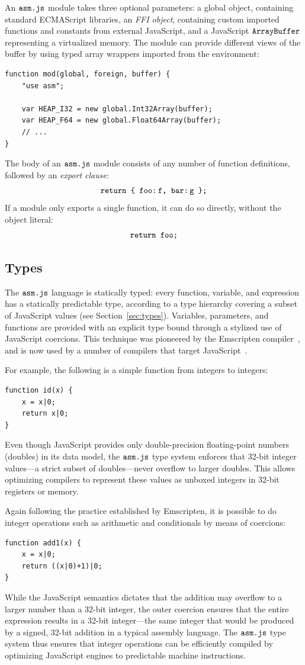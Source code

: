 \documentclass{article}
\newcommand{\mathjs}[1]{\mbox{\texttt{{#1}}}}
\newcommand{\return}[1]{\mathjs{return }{#1}\mathjs{;}}
\begin{document}
An $\mathjs{asm.js}$ module takes three optional parameters: a global
object, containing standard ECMAScript libraries, an {\it FFI object},
containing custom imported functions and constants from external
JavaScript, and a JavaScript $\mathjs{ArrayBuffer}$ representing a
virtualized memory. The module can provide different views of the
buffer by using typed array wrappers imported from the environment:
\begin{verbatim}
function mod(global, foreign, buffer) {
    "use asm";

    var HEAP_I32 = new global.Int32Array(buffer);
    var HEAP_F64 = new global.Float64Array(buffer);
    // ...
}
\end{verbatim}

The body of an $\mathjs{asm.js}$ module consists of any number of
function definitions, followed by an {\it export clause}:
\[
\return{\mathjs{\char123{} foo:\,f, bar:\,g \char125{}}}
\]
If a module only exports a single function, it can do so directly,
without the object literal:
\[
\return{\mathjs{foo}}
\]

\subsection{Types}

The $\mathjs{asm.js}$ language is statically typed: every function,
variable, and expression has a statically predictable type, according
to a type hierarchy covering a subset of JavaScript values (see
Section~\ref{sec:types}). Variables, parameters, and functions are
provided with an explicit type bound through a stylized use of
JavaScript coercions. This technique was pioneered by the Emscripten
compiler~\cite{emscripten}, and is now used by a number of compilers
that target JavaScript~\cite{mandreel,lljs}.

For example, the following is a simple function from integers to
integers:
\begin{verbatim}
function id(x) {
    x = x|0;
    return x|0;
}
\end{verbatim}
Even though JavaScript provides only double-precision floating-point
numbers (doubles) in its data model, the $\mathjs{asm.js}$ type system
enforces that 32-bit integer values---a strict subset of
doubles---never overflow to larger doubles. This allows optimizing
compilers to represent these values as unboxed integers in 32-bit
registers or memory.

Again following the practice established by Emscripten, it is possible
to do integer operations such as arithmetic and conditionals by means
of coercions:
\begin{verbatim}
function add1(x) {
    x = x|0;
    return ((x|0)+1)|0;
}
\end{verbatim}
While the JavaScript semantics dictates that the addition may overflow
to a larger number than a 32-bit integer, the outer coercion ensures
that the entire expression results in a 32-bit integer---the same
integer that would be produced by a signed, 32-bit addition in a
typical assembly language. The $\mathjs{asm.js}$ type system thus
ensures that integer operations can be efficiently compiled by
optimizing JavaScript engines to predictable machine instructions.
\end{document}
